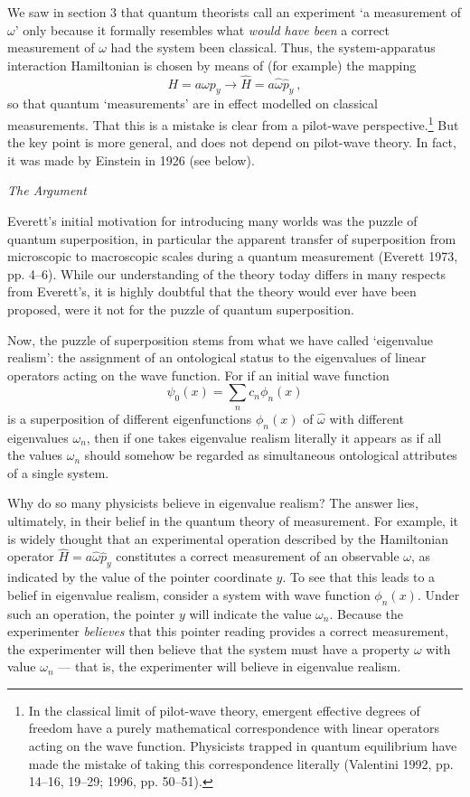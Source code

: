 \documentclass{article}%
\begin{document}
We saw in section 3 that quantum theorists call an experiment `a measurement
of $\omega$' only because it formally resembles what \textit{would have been}
a correct measurement of $\omega$ had the system been classical. Thus, the
system-apparatus interaction Hamiltonian is chosen by means of (for example)
the mapping%
\begin{equation}
H=a\omega p_{y}\longrightarrow\hat{H}=a\hat{\omega}\hat{p}_{y}\ , \label{Map}%
\end{equation}
so that quantum `measurements' are in effect modelled on classical
measurements. That this is a mistake is clear from a pilot-wave
perspective.\footnote{In the classical limit of pilot-wave theory, emergent
effective degrees of freedom have a purely mathematical correspondence with
linear operators acting on the wave function. Physicists trapped in quantum
equilibrium have made the mistake of taking this correspondence literally
(Valentini 1992, pp. 14--16, 19--29; 1996, pp. 50--51).} But the key point is
more general, and does not depend on pilot-wave theory. In fact, it was made
by Einstein in 1926 (see below).

\begin{center}
\textit{The Argument}
\end{center}

Everett's initial motivation for introducing many worlds was the puzzle of
quantum superposition, in particular the apparent transfer of superposition
from microscopic to macroscopic scales during a quantum measurement (Everett
1973, pp. 4--6). While our understanding of the theory today differs in many
respects from Everett's, it is highly doubtful that the theory would ever have
been proposed, were it not for the puzzle of quantum superposition.

Now, the puzzle of superposition stems from what we have called `eigenvalue
realism': the assignment of an ontological status to the eigenvalues of linear
operators acting on the wave function. For if an initial wave function%
\[
\psi_{0}(x)=\sum_{n}c_{n}\phi_{n}(x)
\]
is a superposition of different eigenfunctions $\phi_{n}(x)$ of $\hat{\omega}$
with different eigenvalues $\omega_{n}$, then if one takes eigenvalue realism
literally it appears as if all the values $\omega_{n}$ should somehow be
regarded as simultaneous ontological attributes of a single system.

Why do so many physicists believe in eigenvalue realism? The answer lies,
ultimately, in their belief in the quantum theory of measurement. For example,
it is widely thought that an experimental operation described by the
Hamiltonian operator $\hat{H}=a\hat{\omega}\hat{p}_{y}$ constitutes a correct
measurement of an observable $\omega$, as indicated by the value of the
pointer coordinate $y$. To see that this leads to a belief in eigenvalue
realism, consider a system with wave function $\phi_{n}(x)$. Under such an
operation, the pointer $y$ will indicate the value $\omega_{n}$. Because the
experimenter \textit{believes} that this pointer reading provides a correct
measurement, the experimenter will then believe that the system must have a
property $\omega$ with value $\omega_{n}$ --- that is, the experimenter will
believe in eigenvalue realism.
\end{document}
